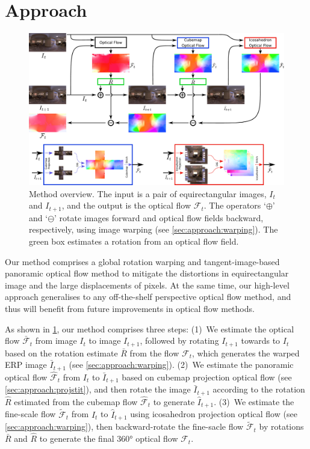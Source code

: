 \section{Approach}
\label{sec:approach}

\begin{figure}%
	\centering
	\includegraphics[width=0.95\linewidth]{images/method_pipeline_1.pdf}
	\caption{Method overview.
		The input is a pair of equirectangular images, $I_t$ and $I_{t+1}$, and the output is the optical flow $\mathcal{F}_t$.
		The operators `$\oplus$' and `$\ominus$' rotate images forward and optical flow fields backward, respectively, using image warping (see \cref{sec:approach:warping}).
		The green box estimates a rotation from an optical flow field.
	}
	\label{fig:approach:pipeline}
\end{figure}

Our method comprises a global rotation warping and tangent-image-based panoramic optical flow method to mitigate the distortions in equirectangular image and the large displacements of pixels.
At the same time, our high-level approach generalises to any off-the-shelf perspective optical flow method, and thus will benefit from future improvements in optical flow methods.


As shown in \cref{fig:approach:pipeline}, our method comprises three steps:
%
(1)~We estimate the optical flow $\bar{\mathcal{F}}_t$ from image $I_{t}$ to image ${I_{t+1}}$, followed by rotating $I_{t+1}$ towards to $I_{t}$ based on the rotation estimate $\bar{R}$ from the flow $\mathcal{F}_t$, which generates the warped ERP image ${\bar{I}}_{t+1}$ (see \cref{sec:approach:warping}).
%
(2)~We estimate the panoramic optical flow ${\hat{\mathcal{F}}}_t$ from $I_{t}$ to ${\bar{I}}_{t+1}$ based on cubemap projection optical flow (see \cref{sec:approach:projstit}), and then rotate the image ${\bar{I}}_{t+1}$ according to the rotation $\hat{R}$ estimated from the cubemap flow ${\hat{\mathcal{F}}}_t$ to generate ${\hat{I}}_{t+1}$.
%
(3)~We estimate the fine-scale flow $\tilde{\mathcal{F}}_t$ from $I_{t}$ to ${\hat{I}}_{t+1}$ using icosahedron projection optical flow (see \cref{sec:approach:warping}), then backward-rotate the fine-sacle flow $\tilde{\mathcal{F}}_t$ by rotations $\bar{R}$ and $\hat{R}$ to generate the final 360° optical flow $\mathcal{F}_t$.


